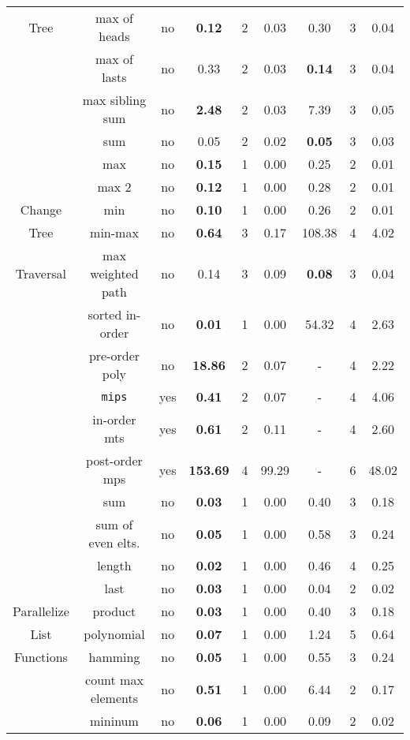 \begin{table}
{\begin{tabular}[h]{|c|c|c|c|c|c||c|c|c|}
			Tree & max of heads & no & {\bfseries 0.12} & 2 & 0.03 & 0.30 & 3 & 0.04\\ 
			 & max of lasts & no & 0.33 & 2 & 0.03 & {\bfseries 0.14} & 3 & 0.04\\ 
			 & max sibling sum & no & {\bfseries 2.48} & 2 & 0.03 & 7.39 & 3 & 0.05\\ 
			\hline
			 & sum & no & 0.05 & 2 & 0.02 & {\bfseries 0.05} & 3 & 0.03\\ 
			 & max & no & {\bfseries 0.15} & 1 & 0.00 & 0.25 & 2 & 0.01\\ 
			 & max 2 & no & {\bfseries 0.12} & 1 & 0.00 & 0.28 & 2 & 0.01\\ 
			Change & min & no & {\bfseries 0.10} & 1 & 0.00 & 0.26 & 2 & 0.01\\ 
			Tree & min-max & no & {\bfseries 0.64} & 3 & 0.17 & 108.38 & 4 & 4.02\\ 
			Traversal & max weighted path & no & 0.14 & 3 & 0.09 & {\bfseries 0.08} & 3 & 0.04\\ 
			 & sorted in-order & no & {\bfseries 0.01} & 1 & 0.00 & 54.32 & 4 & 2.63\\ 
			 & pre-order poly & no & {\bfseries 18.86} & 2 & 0.07 & - & 4 & 2.22\\ 
			 & {\tt mips} & yes & {\bfseries 0.41} & 2 & 0.07 & - & 4 & 4.06\\ 
			 & in-order mts & yes & {\bfseries 0.61} & 2 & 0.11 & - & 4 & 2.60\\ 
			 & post-order mps & yes & {\bfseries 153.69} & 4 & 99.29 & - & 6 & 48.02\\ 
			\hline
			 & sum & no & {\bfseries 0.03} & 1 & 0.00 & 0.40 & 3 & 0.18\\ 
			 & sum of even elts. & no & {\bfseries 0.05} & 1 & 0.00 & 0.58 & 3 & 0.24\\ 
			 & length & no & {\bfseries 0.02} & 1 & 0.00 & 0.46 & 4 & 0.25\\ 
			 & last & no & {\bfseries 0.03} & 1 & 0.00 & 0.04 & 2 & 0.02\\ 
			Parallelize & product & no & {\bfseries 0.03} & 1 & 0.00 & 0.40 & 3 & 0.18\\ 
			List & polynomial & no & {\bfseries 0.07} & 1 & 0.00 & 1.24 & 5 & 0.64\\ 
			Functions & hamming & no & {\bfseries 0.05} & 1 & 0.00 & 0.55 & 3 & 0.24\\ 
			 & count max elements & no & {\bfseries 0.51} & 1 & 0.00 & 6.44 & 2 & 0.17\\ 
			 & mininum & no & {\bfseries 0.06} & 1 & 0.00 & 0.09 & 2 & 0.02\\ 

\end{tabular}}
\end{table}
